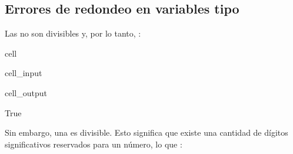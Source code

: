 \documentclass[letterpaper,10pt,english]{jupyterBook}
\begin{document}
\subsection{Errores de redondeo en variables tipo }
\label{\detokenize{1.1-Aspectos_generales/1.1-Aspectos_generales:errores-de-redondeo-en-variables-tipo-float}}
\sphinxAtStartPar
Las  no son divisibles y, por lo tanto, :

\begin{sphinxuseclass}{cell}\begin{sphinxVerbatimInput}

\begin{sphinxuseclass}{cell_input}
\begin{sphinxVerbatim}[commandchars=\\\{\}]
    
\end{sphinxVerbatim}

\end{sphinxuseclass}\end{sphinxVerbatimInput}
\begin{sphinxVerbatimOutput}

\begin{sphinxuseclass}{cell_output}
\begin{sphinxVerbatim}[commandchars=\\\{\}]
True
\end{sphinxVerbatim}

\end{sphinxuseclass}\end{sphinxVerbatimOutput}

\end{sphinxuseclass}
\sphinxAtStartPar
Sin embargo, una  es divisible. Esto significa que existe una cantidad de dígitos significativos reservados para un número, lo que :
\end{document}
